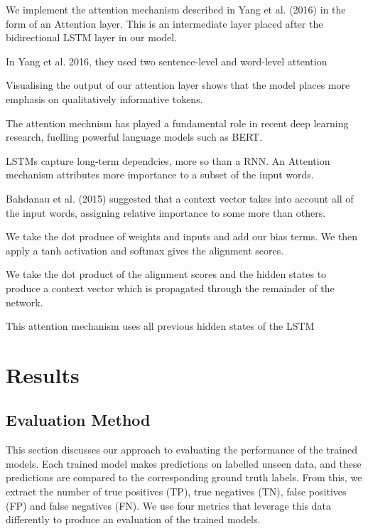 \documentclass[12pt,a4paper]{article}
\begin{document}
We implement the attention mechanism described in  Yang et al. (2016) \cite{yang2016hierarchical} in the form of an Attention layer. This is an intermediate layer placed after the bidirectional LSTM layer in our model.

In Yang et al. 2016, they used two sentence-level and word-level attention

Visualising the output of our attention layer shows that the model places more emphasis on qualitatively informative tokens.

The attention mechnism has played a fundamental role in recent deep learning research, fuelling powerful language models such as BERT. 

LSTMs capture long-term dependcies, more so than a RNN. 
An Attention mechanism attributes more importance to a subset of the input words.

Bahdanau et al. (2015) suggested that a context vector takes into account all of the input words, assigning relative importance to some more than others.

We take the dot produce of weights and inputs and add our bias terms. 
We then apply a tanh activation and softmax gives the alignment scores.

We take the dot product of the alignment scores and the hidden states to produce a context vector which is propagated through the remainder of the network.

This attention mechanism uses all previous hidden states of the LSTM


\newpage
\section{Results}
\subsection{Evaluation Method}
\noindent This section discusses our approach to evaluating the performance of the trained models. Each trained model makes predictions on labelled unseen data, and these predictions are compared to the corresponding ground truth labels. From this, we extract the number of true positives (TP), true negatives (TN), false positives (FP) and false negatives (FN). We use four metrics that leverage this data differently to produce an evaluation of the trained models.
\end{document}
